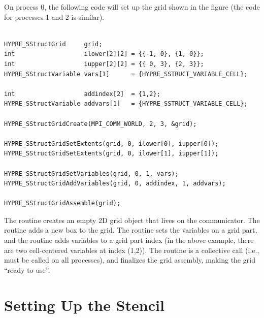 On process 0, the following code will set up the grid shown in the
figure (the code for processes 1 and 2 is similar).
\begin{display}
\begin{verbatim}

HYPRE_SStructGrid     grid;
int                   ilower[2][2] = {{-1, 0}, {1, 0}};
int                   iupper[2][2] = {{ 0, 3}, {2, 3}};
HYPRE_SStructVariable vars[1]      = {HYPRE_SSTRUCT_VARIABLE_CELL};

int                   addindex[2]  = {1,2};
HYPRE_SStructVariable addvars[1]   = {HYPRE_SSTRUCT_VARIABLE_CELL};

HYPRE_SStructGridCreate(MPI_COMM_WORLD, 2, 3, &grid);

HYPRE_SStructGridSetExtents(grid, 0, ilower[0], iupper[0]);
HYPRE_SStructGridSetExtents(grid, 0, ilower[1], iupper[1]);

HYPRE_SStructGridSetVariables(grid, 0, 1, vars);
HYPRE_SStructGridAddVariables(grid, 0, addindex, 1, addvars);

HYPRE_SStructGridAssemble(grid);

\end{verbatim}
\end{display}
The  routine creates an empty 2D grid
object that lives on the  communicator.  The
 routine adds a new box to the
grid.  The  routine sets the
variables on a grid part, and the
 routine adds variables to a grid
part index (in the above example, there are two cell-centered
variables at index (1,2)).  The 
routine is a collective call (i.e., must be called on all processes),
and finalizes the grid assembly, making the grid ``ready to use''.


\section{Setting Up the Stencil}
\label{sstruct:Setting Up the Stencil}

